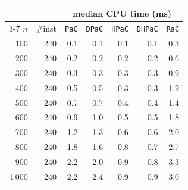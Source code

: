 \begin{tabular}{@{}rrrrrrr@{}}
\toprule
 &  & \multicolumn{5}{c}{median CPU time (ms)} \\
\cmidrule(l){3-7}
$n$ & \#inst & \texttt{PaC} & \texttt{DPaC} & \texttt{HPaC} & \texttt{DHPaC} & \texttt{RaC} \\
\midrule
100 & 240 & 0.1 & 0.1 & 0.1 & 0.1 & 0.3 \\
200 & 240 & 0.2 & 0.2 & 0.2 & 0.2 & 0.6 \\
300 & 240 & 0.3 & 0.3 & 0.3 & 0.3 & 0.9 \\
400 & 240 & 0.5 & 0.5 & 0.3 & 0.3 & 1.2 \\
500 & 240 & 0.7 & 0.7 & 0.4 & 0.4 & 1.4 \\
600 & 240 & 0.9 & 1.0 & 0.5 & 0.5 & 1.8 \\
700 & 240 & 1.2 & 1.3 & 0.6 & 0.6 & 2.0 \\
800 & 240 & 1.8 & 1.6 & 0.8 & 0.7 & 2.7 \\
900 & 240 & 2.2 & 2.0 & 0.9 & 0.8 & 3.3 \\
1\,000 & 240 & 2.2 & 2.4 & 0.9 & 0.9 & 3.0 \\
\bottomrule
\end{tabular}
